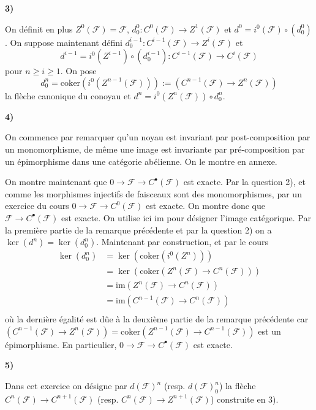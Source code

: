 \documentclass[a4paper,12pt]{article}
\newcommand{\F}{\mathscr F}
\newcommand{\im}{\textrm{im}}
\newcommand{\coker}{\textrm{coker}}
\theoremstyle{plain}
\theoremstyle{definition}
\theoremstyle{remark}
\begin{document}
\begin{center}
	\textbf{3)}
\end{center}
On définit en plus $Z^0(\F)=\F$, $d_0^0\colon C^0(\F)\to Z^1(\F)$
et $d^0=i^0(\F)\circ(d_0^0)$. On suppose maintenant défini
$d_0^{i-1}\colon C^{i-1}(\F) \to Z^i(\F)$ et 
\[d^{i-1}=i^0(Z^{i-1})\circ(d_0^{i-1})\colon C^{i-1}(\F)\to C^i(\F)\]
pour $n\geq i\geq 1$. On pose 
\[d_0^{n}=\coker(i^0(Z^{n-1}(\F))):=(C^{n-1}(\F)\to Z^n(\F))\]
la flèche canonique du conoyau et $d^n=i^0(Z^n(\F))\circ d_0^n$. 

\begin{center}
	\textbf{4)}
\end{center}

On commence par remarquer qu'un noyau est invariant par post-composition
par un monomorphisme, de même une image est invariante par 
pré-composition par un épimorphisme dans une catégorie abélienne.
On le montre en annexe.
\newline

On montre maintenant que $0\to \F\to C^\bullet(\F)$ est exacte. 
Par la question 2), et comme les morphismes injectifs de faisceaux sont
des monomorphismes, par un exercice du cours $0\to \F\to C^0(\F)$ est 
exacte. On montre donc que $\F\to C^\bullet(\F)$ est exacte. On utilise
ici $\im$ pour désigner l'image catégorique.
Par la première partie de la remarque précédente et par la question 2)
on a 
$\ker(d^n)=\ker(d_0^n)$. Maintenant par construction, et par le cours 
\begin{align*}
	\ker(d_0^n)&=\ker(\coker(i^0(Z^n)))\\
		   &=\ker(\coker(Z^n(\F)\to C^n(\F)))\\
		   &=\im(Z^n(\F)\to C^n(\F))\\
		   &=\im(C^{n-1}(\F)\to C^n(\F))\\
\end{align*}
où la dernière égalité est dûe à la deuxième partie de la remarque
précédente car 
$(C^{n-1}(\F)\to Z^n(\F))=\coker(Z^{n-1}(\F)\to C^{n-1}(\F))$
est un épimorphisme. En particulier, $0\to \F\to C^\bullet(\F)$ est
exacte.

\begin{center}
	\textbf{5)}
\end{center}



Dans cet exercice on désigne par $d(\F)^n$ (resp. $d(\F)_0^n$) la
flèche $C^n(\F)\to C^{n+1}(\F)$ (resp. $C^n(\F)\to Z^{n+1}(\F)$) 
construite en 3).
\newline
\end{document}
